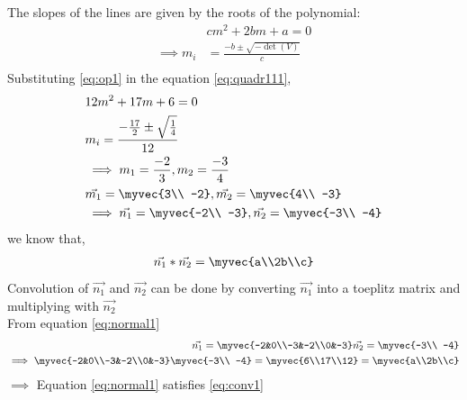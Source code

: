 The slopes of the lines are given by the roots of the polynomial:
\begin{align}
    &cm^2+2bm+a=0 \label{eq:quadr111}\\
    \implies m_i&=\frac{-b\pm{\sqrt{-\det(V)}}}{c}\\
\end{align}
Substituting \eqref{eq:op1} in the equation \eqref{eq:quadr111},
\begin{align}
    &12m^2+17m+6=0 \label{eq:quadr1}\\
    &m_i=\frac{-\frac{17}{2}\pm{\sqrt{\frac{1}{4}}}}{12}\\
    &\implies m_1 = \frac{-2}{3} , m_2 = \frac{-3}{4}\\
    & \vec{m_1}=\myvec{3\\ -2}, \vec{m_2}=\myvec{4\\ -3}\\
    &\implies \vec{n_1}=\myvec{-2\\ -3}, \vec{n_2}=\myvec{-3\\ -4} \label{eq:normal1}
\end{align}
we know that, 
\begin{align}
\vec{n_1}\ast \vec{n_2} = \myvec{a\\2b\\c} \label{eq:conv1}
\end{align}
Convolution of $\vec{n_1}$ and $\vec{n_2}$ can be done by converting $\vec{n_1}$ into a toeplitz matrix and multiplying with $\vec{n_2}$\\
From equation \eqref{eq:normal1}
\begin{align}
    \vec{n_1}=\myvec{-2&0\\-3&-2\\0&-3}
    \vec{n_2}=\myvec{-3\\ -4}\label{eq:conv2}\\
\implies \myvec{-2&0\\-3&-2\\0&-3}\myvec{-3\\ -4} = \myvec{6\\17\\12} = \myvec{a\\2b\\c}\label{eq:conv3}
\end{align}
$\implies$ Equation \eqref{eq:normal1} satisfies \eqref{eq:conv1}\\

